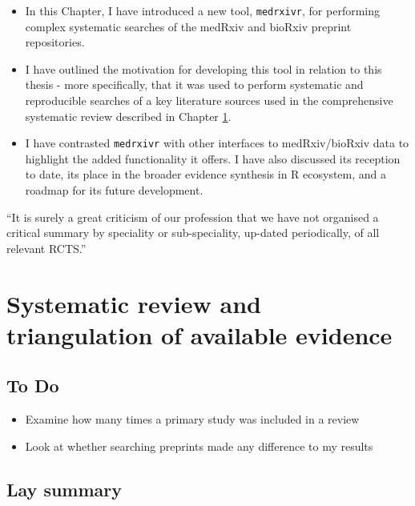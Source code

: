 \documentclass[a4paper, twoside]{templates/ociamthesis}
\providecommand{\tightlist}{%
  \setlength{\itemsep}{0pt}\setlength{\parskip}{0pt}}
\begin{document}
\begin{itemize}
\item
  In this Chapter, I have introduced a new tool, \texttt{medrxivr}, for performing complex systematic searches of the medRxiv and bioRxiv preprint repositories.
\item
  I have outlined the motivation for developing this tool in relation to this thesis - more specifically, that it was used to perform systematic and reproducible searches of a key literature sources used in the comprehensive systematic review described in Chapter \ref{sys-rev-heading}.
\item
  I have contrasted \texttt{medrxivr} with other interfaces to medRxiv/bioRxiv data to highlight the added functionality it offers. I have also discussed its reception to date, its place in the broader evidence synthesis in R ecosystem, and a roadmap for its future development.
\end{itemize}

\begin{savequote}
``It is surely a great criticism of our profession that we have not
organised a critical summary by speciality or sub-speciality, up-dated
periodically, of all relevant RCTS.''
\end{savequote}



\hypertarget{sys-rev-heading}{%
\chapter{Systematic review and triangulation of available evidence}\label{sys-rev-heading}}

\minitoc 

\hypertarget{to-do}{%
\section{To Do}\label{to-do}}

\begin{itemize}
\tightlist
\item
  Examine how many times a primary study was included in a review\\
\item
  Look at whether searching preprints made any difference to my results
\end{itemize}

\hypertarget{lay-summary-1}{%
\section{Lay summary}\label{lay-summary-1}}
\end{document}
